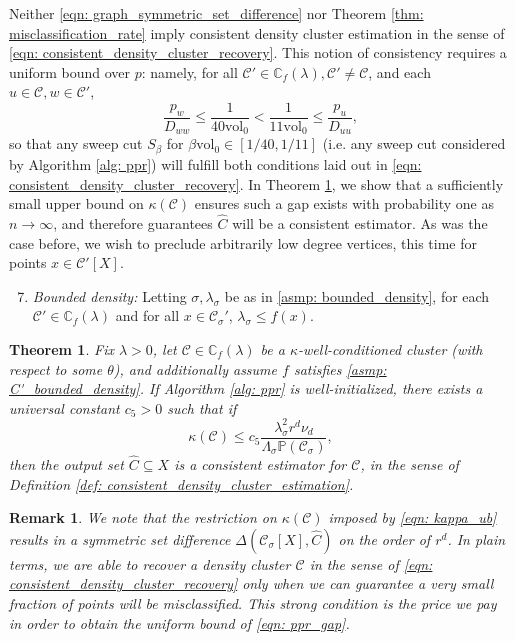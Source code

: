\documentclass{article}
\newcommand{\vol}{\mathrm{vol}}
\newcommand{\1}{\mathbf{1}}
\newcommand{\pbf}{p}        %
\newcommand{\Xbf}{X}             %
\newcommand{\Dbf}{D}
\newcommand{\Pbb}{\mathbb{P}}
\newcommand{\Cbb}{\mathbb{C}}
\newcommand{\Cset}{\mathcal{C}}
\newcommand{\Csig}{\Cset_{\sigma}}
\newcommand{\Cest}{\widehat{C}}
\theoremstyle{aldenthm}
\newtheorem{theorem}{Theorem}
\theoremstyle{aldenrmrk}
\newtheorem{remark}{Remark}
\begin{document}
Neither \eqref{eqn: graph_symmetric_set_difference} nor Theorem \ref{thm: misclassification_rate} imply consistent density cluster estimation in the sense of \eqref{eqn: consistent_density_cluster_recovery}. This notion of consistency requires a uniform bound over $\pbf$: namely, for all $\Cset' \in \Cbb_f(\lambda), \Cset' \neq \Cset$, and each $u \in \Cset, w \in \Cset'$,
\begin{equation}
\label{eqn: ppr_gap}
\frac{p_{w}}{\Dbf_{ww}} \leq \frac{1}{40\vol_0} < \frac{1}{11\vol_0} \leq \frac{p_u}{\Dbf_{uu}},
\end{equation}
so that any sweep cut $S_{\beta}$ for $\beta \vol_0 \in [1/40,1/11]$ (i.e. any sweep cut considered by Algorithm \ref{alg: ppr}) will fulfill both conditions laid out in \eqref{eqn: consistent_density_cluster_recovery}. In Theorem \ref{thm: consistent_recovery_of_density_clusters}, we show that a sufficiently small upper bound on $\kappa(\Cset)$ ensures such a gap exists with probability one as $n \to \infty$, and therefore guarantees $\Cest$ will be a consistent estimator. As was the case before, we wish to preclude arbitrarily low degree vertices, this time for points $x \in \Cset'[\Xbf]$.
\begin{enumerate}[label=(A\arabic*)]
	\setcounter{enumi}{6}
	\item 
	\label{asmp: C'_bounded_density}
	\emph{Bounded density:} Letting $\sigma,\lambda_{\sigma}$ be as in \ref{asmp: bounded_density}, for each $\Cset' \in \Cbb_f(\lambda)$ and for all $x \in \Csig'$, $\lambda_{\sigma} \leq f(x)$.
\end{enumerate}

\begin{theorem}
	\label{thm: consistent_recovery_of_density_clusters}
	Fix $\lambda > 0$, let $\Cset \in \Cbb_f(\lambda)$ be a $\kappa$-well-conditioned cluster (with respect to some $\theta$), and additionally assume $f$ satisfies \ref{asmp: C'_bounded_density}. If Algorithm \ref{alg: ppr} is well-initialized, there exists a universal constant $c_5 > 0$ such that if
	\begin{equation}
	\label{eqn: kappa_ub}
	\kappa(\Cset) \leq c_5 \frac{\lambda_{\sigma}^2r^d \nu_d}{\Lambda_{\sigma}\Pbb(\Csig)},
	\end{equation}
	then the output set $\Cest \subseteq \Xbf$ is a consistent estimator for $\Cset$, in the sense of Definition \ref{def: consistent_density_cluster_estimation}.
\end{theorem}

\begin{remark}
	We note that the restriction on $\kappa(\Cset)$ imposed by \eqref{eqn: kappa_ub} results in a symmetric set difference $\Delta(\Csig[\Xbf], \Cest)$ on the order of $r^d$. In plain terms, we are able to recover a density cluster $\Cset$ in the sense of \eqref{eqn: consistent_density_cluster_recovery} only when we can guarantee a very small fraction of points will be misclassified. This strong condition is the price we pay in order to obtain the uniform bound of \eqref{eqn: ppr_gap}.
\end{remark}
\end{document}
